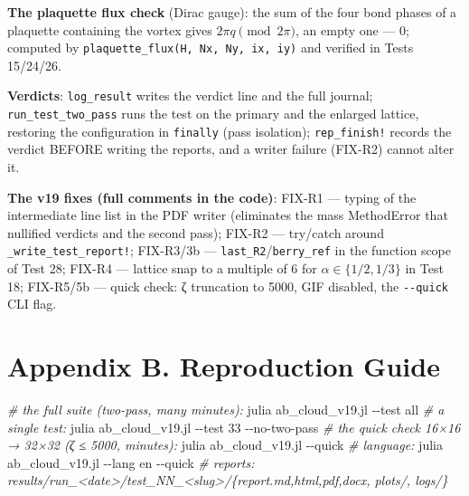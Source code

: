 \documentclass[
]{article}
\newenvironment{Shaded}{}{}
\newcommand{\AttributeTok}[1]{\textcolor[rgb]{0.49,0.56,0.16}{#1}}
\newcommand{\CommentTok}[1]{\textcolor[rgb]{0.38,0.63,0.69}{\textit{#1}}}
\newcommand{\ExtensionTok}[1]{#1}
\newcommand{\NormalTok}[1]{#1}
\begin{document}
\textbf{The plaquette flux check} (Dirac gauge): the sum of the four
bond phases of a plaquette containing the vortex gives
\(2\pi q \pmod{2\pi}\), an empty one --- 0; computed by
\texttt{plaquette\_flux(H,\ Nx,\ Ny,\ ix,\ iy)} and verified in Tests
15/24/26.

\textbf{Verdicts}: \texttt{log\_result} writes the verdict line and the
full journal; \texttt{run\_test\_two\_pass} runs the test on the primary
and the enlarged lattice, restoring the configuration in
\texttt{finally} (pass isolation); \texttt{rep\_finish!} records the
verdict BEFORE writing the reports, and a writer failure (FIX-R2) cannot
alter it.

\textbf{The v19 fixes (full comments in the code)}: FIX-R1 --- typing of
the intermediate line list in the PDF writer (eliminates the mass
MethodError that nullified verdicts and the second pass); FIX-R2 ---
try/catch around \texttt{\_write\_test\_report!}; FIX-R3/3b ---
\texttt{last\_R2}/\texttt{berry\_ref} in the function scope of Test 28;
FIX-R4 --- lattice snap to a multiple of 6 for \(\alpha\in\{1/2,1/3\}\)
in Test 18; FIX-R5/5b --- quick check: ζ truncation to 5000, GIF
disabled, the \texttt{-\/-quick} CLI flag.

\section{Appendix B. Reproduction
Guide}\label{appendix-b.-reproduction-guide}

\begin{Shaded}
\begin{Highlighting}[]
\CommentTok{\# the full suite (two{-}pass, many minutes):}
\ExtensionTok{julia}\NormalTok{ ab\_cloud\_v19.jl }\AttributeTok{{-}{-}test}\NormalTok{ all}
\CommentTok{\# a single test:}
\ExtensionTok{julia}\NormalTok{ ab\_cloud\_v19.jl }\AttributeTok{{-}{-}test}\NormalTok{ 33 }\AttributeTok{{-}{-}no{-}two{-}pass}
\CommentTok{\# the quick check 16×16 → 32×32 (ζ ≤ 5000, minutes):}
\ExtensionTok{julia}\NormalTok{ ab\_cloud\_v19.jl }\AttributeTok{{-}{-}quick}
\CommentTok{\# language:}
\ExtensionTok{julia}\NormalTok{ ab\_cloud\_v19.jl }\AttributeTok{{-}{-}lang}\NormalTok{ en }\AttributeTok{{-}{-}quick}
\CommentTok{\# reports: results/run\_\textless{}date\textgreater{}/test\_NN\_\textless{}slug\textgreater{}/\{report.md,html,pdf,docx, plots/, logs/\}}
\end{Highlighting}
\end{Shaded}
\end{document}
